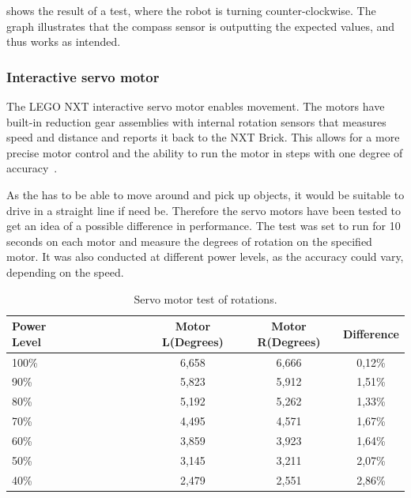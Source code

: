  shows the result of a test, where the robot is turning counter-clockwise. The graph illustrates that the compass sensor is outputting the expected values, and thus works as intended. 

\subsubsection{Interactive servo motor} \label{sec:servo_motor}
The LEGO NXT interactive servo motor enables movement. The motors have built-in reduction gear assemblies with internal rotation sensors that measures speed and distance and reports it back to the NXT Brick. This allows for a more precise motor control and the ability to run the motor in steps with one degree of accuracy~\citep{lego_education}.

As the \projname{} has to be able to move around and pick up objects, it would be suitable to drive in a straight line if need be. Therefore the servo motors have been tested to get an idea of a possible difference in performance. The test was set to run for 10 seconds on each motor and measure the degrees of rotation on the specified motor. It was also conducted at different power levels, as the accuracy could vary, depending on the speed. 

\begin{table}[H]
	\centering
    \begin{tabular}{lccc}
    \hline  
    \rowcolor{DGray}
    \textbf{Power Level}~~~~~~~~~~~~ & Motor L(Degrees) & Motor R(Degrees) & Difference \\ \hline 
    100\%                  & 6,658                  & 6,666                & 0,12\% \\
    90\%                   & 5,823                  & 5,912                & 1,51\% \\
    80\%                   & 5,192                  & 5,262                & 1,33\% \\
    70\%                   & 4,495                  & 4,571                & 1,67\% \\
    60\%                   & 3,859                  & 3,923                & 1,64\% \\
    50\%                   & 3,145                  & 3,211                & 2,07\% \\
    40\%                   & 2,479                  & 2,551                & 2,86\% \\
    \hline 
    \end{tabular}
    \caption{\label{table:servo_motor_test} Servo motor test of rotations.}
\end{table}

